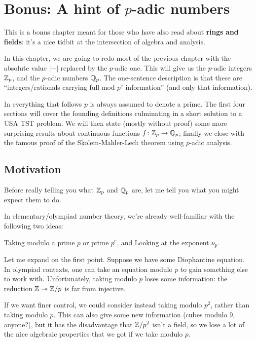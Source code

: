 \chapter[Bonus: A hint of p-adic numbers]{Bonus: A hint of $p$-adic numbers}
This is a bonus chapter meant for those
who have also read about \textbf{rings and fields}:
it's a nice tidbit at the intersection of algebra and analysis.


In this chapter, we are going to redo most of the previous chapter
with the absolute value $\left\lvert - \right\rvert$
replaced by the $p$-adic one.
This will give us the $p$-adic integers $\mathbb Z_p$,
and the $p$-adic numbers $\mathbb Q_p$.
The one-sentence description is that these are
``integers/rationals carrying full mod $p^e$ information''
(and only that information).

In everything that follows $p$ is always assumed to denote a prime.
The first four sections will cover the founding definitions
culminating in a short solution to a USA TST problem.
We will then state (mostly without proof) some more
surprising results about continuous functions $f \colon \mathbb Z_p \to \mathbb Q_p$;
finally we close with the famous proof of the Skolem-Mahler-Lech theorem
using $p$-adic analysis.


\section{Motivation}
Before really telling you what $\mathbb Z_p$ and $\mathbb Q_p$ are,
let me tell you what you might expect them to do.

In elementary/olympiad number theory,
we're already well-familiar with the following two ideas:
\begin{itemize}
	\ii Taking modulo a prime $p$ or prime $p^e$, and
	\ii Looking at the exponent $\nu_p$.
\end{itemize}

Let me expand on the first point.
Suppose we have some Diophantine equation.
In olympiad contexts, one can take an equation modulo $p$
to gain something else to work with.
Unfortunately, taking modulo $p$ loses some information:
the reduction $\mathbb Z \twoheadrightarrow \mathbb Z/p$ is far from injective.

If we want finer control, we could consider instead
taking modulo $p^2$, rather than taking modulo $p$.
This can also give some new information (cubes modulo $9$, anyone?),
but it has the disadvantage that $\mathbb Z/p^2$ isn't a field,
so we lose a lot of the nice algebraic properties that we
got if we take modulo $p$.

